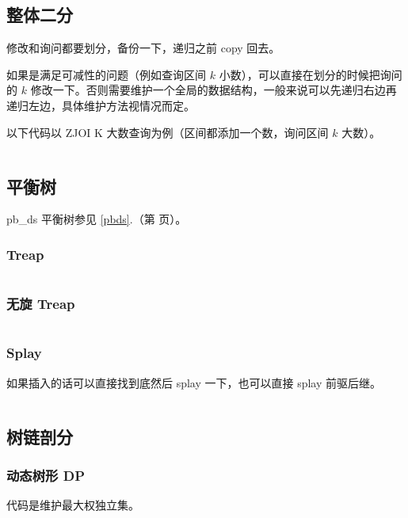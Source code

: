 \documentclass[a4paper, twoside]{article}
\newcommand\detailedref[1]{\ref{#1}.\nameref{#1}（第 \pageref{#1} 页）}
\begin{document}
\begin{multicols}{2}
			\subsection{整体二分}
				修改和询问都要划分，备份一下，递归之前 copy 回去。

				如果是满足可减性的问题（例如查询区间 $k$ 小数），可以直接在划分的时候把询问的 $k$ 修改一下。否则需要维护一个全局的数据结构，一般来说可以先递归右边再递归左边，具体维护方法视情况而定。

				以下代码以 ZJOI K 大数查询为例（区间都添加一个数，询问区间 $k$ 大数）。

				\inputminted{cpp}{../src/datastructure/整体二分.cpp}

	
	
			\subsection{平衡树}
				pb\_ds 平衡树参见 \detailedref{pbds}。

				\subsubsection{Treap}
					\inputminted{cpp}{../src/datastructure/Treap.cpp}
					
				\subsubsection[无旋 Treap / 可持久化 Treap]{无旋 Treap}
					\inputminted{cpp}{../src/datastructure/无旋Treap.cpp}
		
				\subsubsection{Splay}
					如果插入的话可以直接找到底然后 splay 一下，也可以直接 splay 前驱后继。
					\inputminted{cpp}{../src/datastructure/文艺平衡树.cpp}
				
			\subsection{树链剖分}
				\subsubsection[动态树形 DP（最大权独立集）]{动态树形 DP}
					代码是维护最大权独立集。
					\inputminted{cpp}{../src/datastructure/动态树形DP.cpp}
				

\end{multicols}
\end{document}

